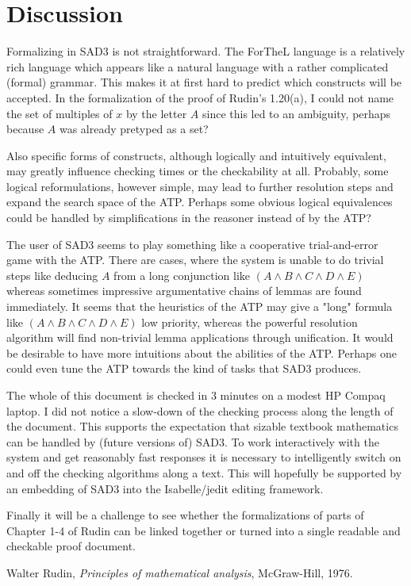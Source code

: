 \documentclass{article}
\begin{document}
\section{Discussion}

Formalizing in SAD3 is not straightforward. The ForTheL language is a relatively rich language which appears like a natural language with a rather complicated (formal) grammar. This makes it at first hard to predict which constructs will be accepted. In the formalization of the proof of Rudin's 1.20(a), I could not name the set of multiples of $x$ by the letter $A$ since this led to an ambiguity, perhaps because $A$ was already pretyped as a set?

Also specific forms of constructs, although logically and intuitively equivalent, may greatly influence checking times or the checkability at all. Probably, some logical reformulations, however simple, may lead to further resolution steps and expand the search space of the ATP. Perhaps some obvious logical equivalences could be handled by simplifications in the reasoner instead of by the ATP?

The user of SAD3 seems to play something like a cooperative trial-and-error game with the ATP. There are cases, where the system is unable to do trivial steps like deducing $A$ from a long conjunction like $(A\wedge B\wedge C\wedge D \wedge E)$ whereas sometimes impressive argumentative chains of lemmas are found immediately. It seems that the heuristics of the ATP may give a "long" formula like $(A\wedge B\wedge C\wedge D \wedge E)$ low priority, whereas the powerful resolution algorithm will find non-trivial lemma applications through unification. It would be desirable to have more intuitions about the abilities of the ATP. Perhaps one could even tune the ATP towards the kind of tasks that SAD3 produces.  

The whole of this document is checked in 3 minutes on a modest HP Compaq laptop. I did not notice a slow-down of the checking process along the length of the document. This supports the expectation that sizable textbook mathematics can be handled by (future versions of) SAD3. To work interactively with the system and get reasonably fast responses it is necessary to intelligently switch on and off the checking algorithms along a text. This will hopefully be supported by an embedding of SAD3 into the Isabelle/jedit editing framework.

Finally it will be a challenge to see whether the formalizations of parts of Chapter 1-4 of Rudin can be linked together or turned into a single readable and checkable proof document.

\begin{thebibliography}{1}

  Walter Rudin,
  \textit{Principles of mathematical analysis},
  McGraw-Hill,
  1976.

\end{thebibliography}
  
\end{document}
